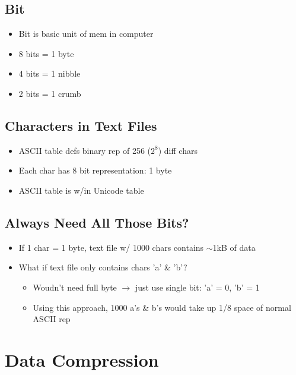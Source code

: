 \documentclass{article}
\begin{document}
\subsection{Bit}
\begin{multicols}{2}
        \begin{itemize}
            \item Bit is basic unit of mem in computer
            \item 8 bits = 1 byte
            \item 4 bits = 1 nibble
            \item 2 bits = 1 crumb
        \end{itemize}

\subsection{Characters in Text Files}
        \begin{itemize}
            \item ASCII table defs binary rep of 256 ($2^8$) diff chars
            \item Each char has 8 bit representation: 1 byte
            \item ASCII table is w/in Unicode table
        \end{itemize}

\subsection{Always Need All Those Bits?}
        \begin{itemize}
            \item If 1 char = 1 byte, text file w/ 1000 chars contains $\sim$1kB of data
            \item What if text file only contains chars 'a' \& 'b'?
                \begin{itemize}
                    \item Woudn't need full byte $\rightarrow$ just use single bit: 'a' = 0, 'b' = 1
                    \item Using this approach, 1000 a's \& b's would take up 1/8 space of normal ASCII rep
                \end{itemize}
        \end{itemize}

\section{Data Compression}

\end{multicols}
\end{document}
